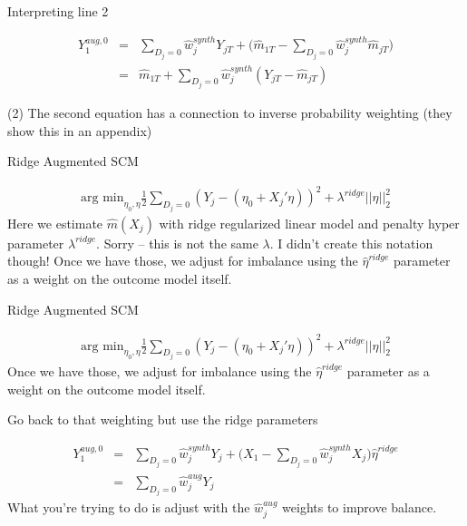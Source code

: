 \documentclass{beamer}
\begin{document}
\begin{frame}{Interpreting line 2}

\begin{eqnarray*}
Y_1^{aug,0}  &=& \sum_{D_j=0} \widehat{w}_j^{synth} Y_{jT} + \bigg (\widehat{m}_{1T} - \sum_{D_j=0} \widehat{w}_j^{synth}\widehat{m}_{jT} \bigg ) \\
&=& \widehat{m}_{1T} + \sum_{D_j=0} \widehat{w}_j^{synth} (Y_{jT} - \widehat{m}_{jT})
\end{eqnarray*}

(2) The second equation has a connection to inverse probability weighting (they show this in an appendix)


\end{frame}
\begin{frame}{Ridge Augmented SCM}

\begin{eqnarray*}
\textrm{arg min}_{\eta_0,\eta} \frac{1}{2} \sum_{D_j=0} (Y_j - (\eta_0 + X_j'\eta))^2 + \lambda^{ridge} || \eta ||_2^2
\end{eqnarray*}Here we estimate $\widehat{m}(X_j)$ with ridge regularized linear model and penalty hyper parameter $\lambda^{ridge}$. Sorry -- this is not the same $\lambda$. I didn't create this notation though! Once we have those, we adjust for imbalance using the $\widehat{\eta}^{ridge}$ parameter as a weight on the outcome model itself. 

\end{frame}

\begin{frame}{Ridge Augmented SCM}

\begin{eqnarray*}
\textrm{arg min}_{\eta_0,\eta} \frac{1}{2} \sum_{D_j=0} (Y_j - (\eta_0 + X_j'\eta))^2 + \lambda^{ridge} || \eta ||_2^2
\end{eqnarray*}Once we have those, we adjust for imbalance using the $\widehat{\eta}^{ridge}$ parameter as a weight on the outcome model itself. 

\end{frame}




\begin{frame}{Go back to that weighting but use the ridge parameters}

\begin{eqnarray*}
Y_1^{aug,0} &=& \sum_{D_j=0} \widehat{w}_j^{synth} Y_{j} + \bigg ( X_1 - \sum_{D_j=0} \widehat{w}_j^{synth} X_j \bigg ) \widehat{\eta}^{ridge} \\
&=& \sum_{D_j=0} \widehat{w}_j^{aug}Y_j
\end{eqnarray*}What you're trying to do is adjust with the $\widehat{w}_j^{aug}$ weights to improve balance.  

\end{frame}
\end{document}
